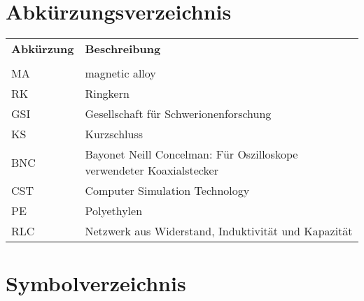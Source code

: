 \chapter*{Abk\"urzungsverzeichnis}
\begin{tabular}{p{} p{}}
\textbf{Abk\"urzung} & \textbf{Beschreibung} \\
 & \\
MA & magnetic alloy \\
RK & Ringkern \\
GSI & Gesellschaft f\"ur Schwerionenforschung \\
KS & Kurzschluss \\
BNC & Bayonet Neill Concelman: F\"ur Oszilloskope verwendeter Koaxialstecker \\
CST & Computer Simulation Technology \\
PE & Polyethylen \\
RLC & Netzwerk aus Widerstand, Induktivit\"at und Kapazit\"at \\
\end{tabular}

\cleardoublepage

\chapter*{Symbolverzeichnis}


